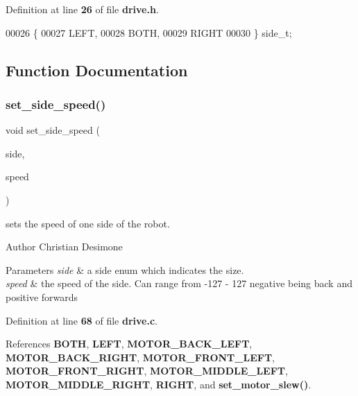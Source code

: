 Definition at line \textbf{ 26} of file \textbf{ drive.\+h}.


\begin{DoxyCode}
00026                  \{
00027   LEFT,
00028   BOTH,
00029   RIGHT
00030 \} side_t;
\end{DoxyCode}


\subsection{Function Documentation}
\mbox{\label{drive_8h_a8df41fd50094c065eedc81fc5e6595d1}} 
\subsubsection{set\+\_\+side\+\_\+speed()}
{\footnotesize\ttfamily void set\+\_\+side\+\_\+speed (\begin{DoxyParamCaption}\item[{\textbf{ side\+\_\+t}}]{side,  }\item[{int}]{speed }\end{DoxyParamCaption})}



sets the speed of one side of the robot. 

\begin{DoxyAuthor}{Author}
Christian Desimone 
\end{DoxyAuthor}

\begin{DoxyParams}{Parameters}
{\em side} & a side enum which indicates the size. \\
\hline
{\em speed} & the speed of the side. Can range from -\/127 -\/ 127 negative being back and positive forwards \\
\hline
\end{DoxyParams}


Definition at line \textbf{ 68} of file \textbf{ drive.\+c}.



References \textbf{ B\+O\+TH}, \textbf{ L\+E\+FT}, \textbf{ M\+O\+T\+O\+R\+\_\+\+B\+A\+C\+K\+\_\+\+L\+E\+FT}, \textbf{ M\+O\+T\+O\+R\+\_\+\+B\+A\+C\+K\+\_\+\+R\+I\+G\+HT}, \textbf{ M\+O\+T\+O\+R\+\_\+\+F\+R\+O\+N\+T\+\_\+\+L\+E\+FT}, \textbf{ M\+O\+T\+O\+R\+\_\+\+F\+R\+O\+N\+T\+\_\+\+R\+I\+G\+HT}, \textbf{ M\+O\+T\+O\+R\+\_\+\+M\+I\+D\+D\+L\+E\+\_\+\+L\+E\+FT}, \textbf{ M\+O\+T\+O\+R\+\_\+\+M\+I\+D\+D\+L\+E\+\_\+\+R\+I\+G\+HT}, \textbf{ R\+I\+G\+HT}, and \textbf{ set\+\_\+motor\+\_\+slew()}.



